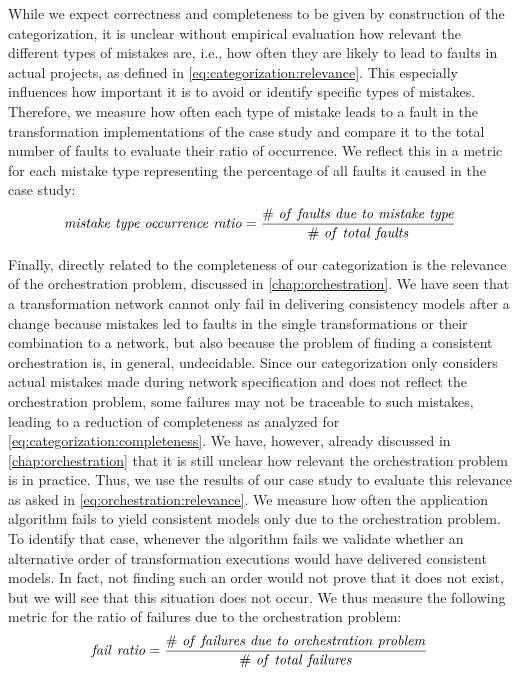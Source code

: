 While we expect correctness and completeness to be given by construction of the categorization, it is unclear without empirical evaluation how relevant the different types of mistakes are, i.e., how often they are likely to lead to faults in actual projects, as defined in \autoref{eq:categorization:relevance}.
This especially influences how important it is to avoid or identify specific types of mistakes.
Therefore, we measure how often each type of mistake leads to a fault in the transformation implementations of the case study and compare it to the total number of faults to evaluate their ratio of occurrence.
We reflect this in a metric for each mistake type representing the percentage of all faults it caused in the case study:
\begin{align*}
    \mathvariable{mistake\ type\ occurrence\ ratio} = \frac{\mathvariable{\#\ of\ faults\ due\ to\ mistake\ type}}{\mathvariable{\#\ of\ total\ faults}}
\end{align*}

Finally, directly related to the completeness of our categorization is the relevance of the orchestration problem, discussed in \autoref{chap:orchestration}.
We have seen that a transformation network cannot only fail in delivering consistency models after a change because mistakes led to faults in the single transformations or their combination to a network, but also because the problem of finding a consistent orchestration is, in general, undecidable.
Since our categorization only considers actual mistakes made during network specification and does not reflect the orchestration problem, some failures may not be traceable to such mistakes, leading to a reduction of completeness as analyzed for \autoref{eq:categorization:completeness}.
We have, however, already discussed in \autoref{chap:orchestration} that it is still unclear how relevant the orchestration problem is in practice.
Thus, we use the results of our case study to evaluate this relevance as asked in \autoref{eq:orchestration:relevance}.
We measure how often the application algorithm fails to yield consistent models only due to the orchestration problem.
To identify that case, whenever the algorithm fails we validate whether an alternative order of transformation executions would have delivered consistent models.
In fact, not finding such an order would not prove that it does not exist, but we will see that this situation does not occur.
We thus measure the following metric for the ratio of failures due to the orchestration problem:
\begin{align*}
    \mathvariable{fail\ ratio} = \frac{\mathvariable{\#\ of\ failures\ due\ to\ orchestration\ problem}}{\mathvariable{\#\ of\ total\ failures}}
\end{align*}


